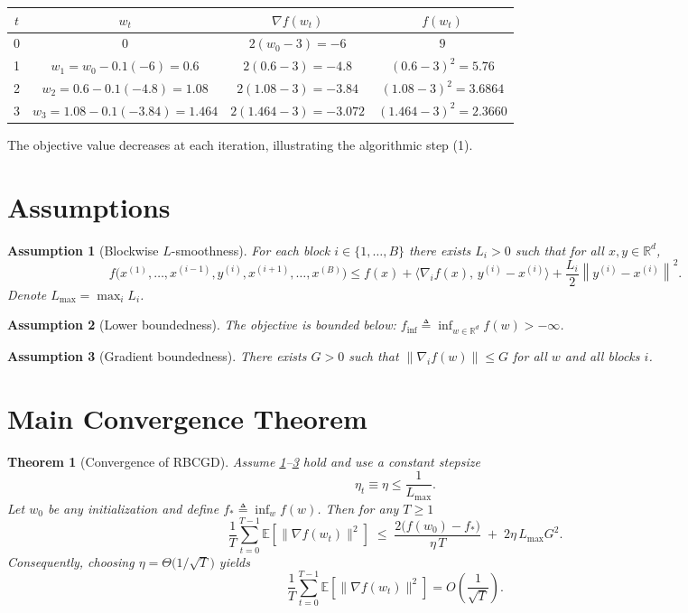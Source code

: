 \documentclass{article}
\newtheorem{theorem}{Theorem}
\newtheorem{assumption}{Assumption}
\newcommand{\E}{\mathbb{E}}
\newcommand{\R}{\mathbb{R}}
\newcommand{\norm}[1]{\left\lVert#1\right\rVert}
\begin{document}
\begin{center}
\begin{tabular}{c|c|c|c}
$t$ & $w_t$ & $\nabla f(w_t)$ & $f(w_t)$\\ \hline
0 & $0$ & $2(w_0-3)=-6$ & $9$\\
1 & $w_1 = w_0 -0.1(-6)=0.6$ & $2(0.6-3)=-4.8$ & $(0.6-3)^2=5.76$\\
2 & $w_2 = 0.6 -0.1(-4.8)=1.08$ & $2(1.08-3)=-3.84$ & $(1.08-3)^2=3.6864$\\
3 & $w_3 = 1.08 -0.1(-3.84)=1.464$ & $2(1.464-3)=-3.072$ & $(1.464-3)^2=2.3660$
\end{tabular}
\end{center}
The objective value decreases at each iteration, illustrating the algorithmic step (1).

\newpage
\section*{Assumptions}
\begin{assumption}[Blockwise $L$-smoothness]\label{ass:smooth}
For each block $i\in\{1,\dots ,B\}$ there exists $L_i>0$ such that for all $x,y\in\R^{d}$,
\[
f\big(x^{(1)},\dots ,x^{(i-1)},y^{(i)},x^{(i+1)},\dots ,x^{(B)}\big)
\le 
f(x)+\langle \nabla_i f(x),\,y^{(i)}-x^{(i)}\rangle
+\frac{L_i}{2}\norm{y^{(i)}-x^{(i)}}^{2}.
\tag{2}
\]
Denote $L_{\max}= \max_i L_i$.
\end{assumption}

\begin{assumption}[Lower boundedness]\label{ass:lb}
The objective is bounded below: $f_{\inf}\triangleq \inf_{w\in\R^{d}} f(w)>-\infty$.
\end{assumption}

\begin{assumption}[Gradient boundedness]\label{ass:grad}
There exists $G>0$ such that $\norm{\nabla_i f(w)}\le G$ for all $w$ and all blocks $i$.
\end{assumption}

\section*{Main Convergence Theorem}
\begin{theorem}[Convergence of RBCGD]\label{thm:main}
Assume \ref{ass:smooth}--\ref{ass:grad} hold and use a constant stepsize 
\[
\eta_t \equiv \eta \le \frac{1}{L_{\max}} .
\tag{3}
\]
Let $w_0$ be any initialization and define $f_* \triangleq \inf_w f(w)$. Then for any $T\ge 1$
\[
\frac{1}{T}\sum_{t=0}^{T-1}\E\!\left[\big\|\nabla f(w_t)\big\|^{2}\right]
\;\le\;
\frac{2\big(f(w_0)-f_*\big)}{\eta\,T}
\;+\;
2\eta\,L_{\max} G^{2}.
\tag{4}
\]
Consequently, choosing $\eta = \Theta\!\big(1/\sqrt{T}\big)$ yields
\[
\frac{1}{T}\sum_{t=0}^{T-1}\E\!\left[\big\|\nabla f(w_t)\big\|^{2}\right]
= O\!\left(\frac{1}{\sqrt{T}}\right).
\]
\end{theorem}
\end{document}

